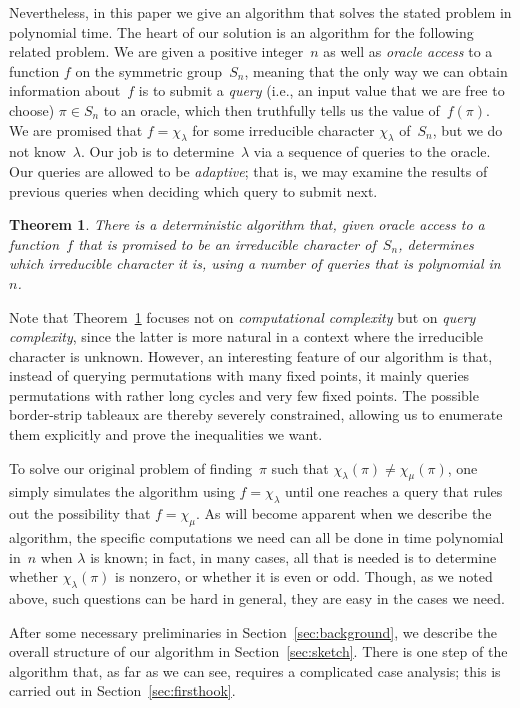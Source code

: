 \documentclass[12pt]{article}
\newtheorem{theorem}{Theorem}
\theoremstyle{definition}
\begin{document}
Nevertheless, in this paper we give an algorithm that
solves the stated problem in polynomial time.
The heart of our solution is an algorithm for
the following related problem.
We are given a positive integer~$n$
as well as \emph{oracle access}
to a function $f$ on the symmetric group~$S_n$,
meaning that the only way we can obtain information about~$f$
is to submit a \emph{query} (i.e., an input value that we are free to choose)
$\pi\in S_n$ to an oracle,
which then truthfully tells us the value of~$f(\pi)$.
We are promised that $f = \chi_\lambda$ for some
irreducible character $\chi_\lambda$ of~$S_n$,
but we do not know~$\lambda$.
Our job is to determine~$\lambda$
via a sequence of queries to the oracle.
Our queries are allowed to be \emph{adaptive}; that is,
we may examine the results of previous queries
when deciding which query to submit next.

\begin{theorem}
\label{thm:main}
There is a deterministic algorithm that, given oracle access to
a function~$f$ that is promised to be an irreducible
character of~$S_n$, determines which irreducible character it is,
using a number of queries that is polynomial in~$n$.
\end{theorem}

Note that Theorem~\ref{thm:main} focuses not on
\emph{computational complexity} but on
\emph{query complexity}, since the latter is more natural
in a context where the irreducible character is unknown.
However, an interesting feature of our algorithm is that,
instead of querying permutations with many fixed points,
it mainly queries permutations with rather long cycles
and very few fixed points.
The possible border-strip tableaux are thereby
severely constrained, allowing us to enumerate them explicitly
and prove the inequalities we want.

To solve our original problem
of finding~$\pi$ such that $\chi_\lambda(\pi) \ne \chi_\mu(\pi)$,
one simply simulates the algorithm using $f = \chi_\lambda$
until one reaches a query that rules out the possibility
that $f=\chi_\mu$.
As will become apparent when we describe the algorithm,
the specific computations we need can all be done in time polynomial
in~$n$ when $\lambda$ is known;
in fact, in many cases,
all that is needed is to determine whether $\chi_\lambda(\pi)$
is nonzero, or whether it is even or odd.
Though, as we noted above, such questions can be hard in general,
they are easy in the cases we need.

After some necessary preliminaries in Section~\ref{sec:background},
we describe the overall structure of our algorithm
in Section~\ref{sec:sketch}.
There is one step of the algorithm that,
as far as we can see, requires a complicated
case analysis; this is carried out in Section~\ref{sec:firsthook}.
\end{document}
